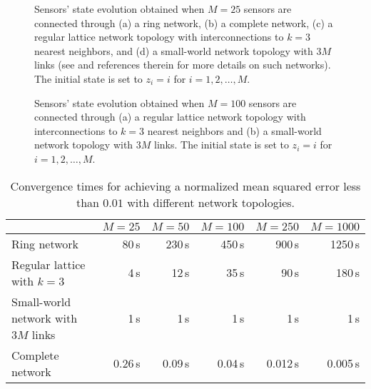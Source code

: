 \documentclass[journal]{IEEEtran}
\begin{document}
\begin{figure}[t]
 \centering
\caption{{Sensors' state evolution obtained when $M=25$ sensors are connected through (a) a ring network, (b) a complete network, (c) a regular lattice network topology with interconnections to $k=3$ nearest neighbors, and (d) a small-world network topology with $3M$ links (see \cite{OlFa07} and references therein for more details on such networks). The initial state is set to $z_i = i$ for $i=1,2,\ldots,M$.}}
\label{fig:forComparison_2}
\end{figure}

\begin{figure}[t]
 \centering
\caption{{Sensors' state evolution obtained when $M=100$ sensors are connected through (a) a regular lattice network topology with interconnections to $k=3$ nearest neighbors and (b) a small-world network topology with $3M$ links. The initial state is set to $z_i = i$ for $i=1,2,\ldots,M$.}}
\label{fig:forComparison}
\end{figure}



\begin{table*}
 \caption{{Convergence times for achieving a normalized mean squared error less than $0.01$ with different network topologies.}}
 \centering\small
 \begin{tabular}{ | l | r r r r r  |} 
 \hline 
							&$M = 25$ 	&  $M= 50$ 	& $M= 100$ 	& $M= 250$	 & $M= 1000$	
 \\ \hline 
 Ring	 network						&80{\,s}	 	& 230{\,s} 	& 450{\,s} 	& 900{\,s} 		& 1250{\,s}
  \\
Regular lattice with $k=3$				&4{\,s}	 & 12{\,s} 	& 35{\,s} 	& 90{\,s}	& 180{\,s} 	  	
 \\
  Small-world network with $3M$ links	 &1{\,s}	 	& 1{\,s}		 & 1{\,s} 	& 1{\,s}	 	& 1{\,s} 	
 \\ 
Complete network					&0.26{\,s}	 & 0.09{\,s} 	& 0.04{\,s} 	& 0.012{\,s} 	& 0.005{\,s} 	
 \\ 
 \hline 
 \end{tabular}
 \label{tabTime}
\end{table*}
\end{document}
